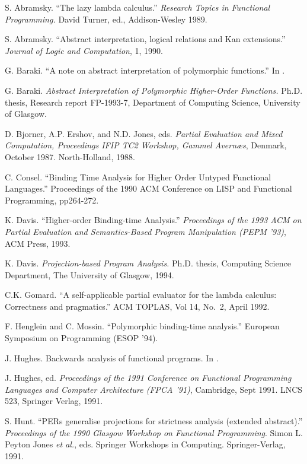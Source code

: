 \documentclass[11pt]{article}
\begin{document}
\begin{thebibliography}{123456}

S. Abramsky. 
``The lazy lambda calculus.'' 
{\it Research Topics in Functional Programming.}
David Turner, ed., Addison-Wesley 1989.

S. Abramsky. 
``Abstract interpretation, logical relations and Kan extensions.''
{\it Journal of Logic and Computation}, 1, 1990.

G. Baraki.
``A note on abstract interpretation of polymorphic functions.''
In \cite{Hug91}.

G. Baraki.
{\it Abstract Interpretation of Polymorphic Higher-Order Functions.}
Ph.D. thesis, Research report FP-1993-7, 
Department of Computing Science, University of Glasgow.

D. Bjorner, A.P. Ershov, and N.D. Jones, eds.
{\it Partial Evaluation and Mixed Computation,
Proceedings IFIP TC2 Workshop, Gammel Avern{\ae}s}, Denmark, October 1987.
North-Holland, 1988.

C. Consel. 
``Binding Time Analysis for Higher Order Untyped Functional Languages.''
Proceedings of the 1990 ACM Conference on LISP and 
Functional Programming, pp264-272.

K. Davis.
``Higher-order Binding-time Analysis.'' 
{\it Proceedings of the 1993 ACM on Partial Evaluation and
Semantics-Based Program Manipulation (PEPM '93)},
ACM Press, 1993.

K. Davis.
{\it Projection-based Program Analysis.}
Ph.D. thesis, Computing Science Department,
The University of Glasgow, 1994.

C.K. Gomard.
``A self-applicable partial evaluator for the lambda calculus:  Correctness
and pragmatics.''
ACM TOPLAS, Vol 14, No.\ 2, April 1992.

F. Henglein and C. Mossin.
``Polymorphic binding-time analysis.''
European Symposium on Programming (ESOP '94).

J. Hughes.
Backwards analysis of functional programs.
In \cite{BEJ88}.

J. Hughes, ed.
{\it Proceedings of the 1991 Conference on Functional Programming Languages
and Computer Architecture (FPCA '91)}, Cambridge, Sept 1991. LNCS 523,
Springer Verlag, 1991.

S. Hunt.
``PERs generalise projections for strictness analysis (extended abstract).''
{\it Proceedings of the 1990 Glasgow Workshop
on Functional Programming}.
Simon L. Peyton Jones {\it et al.}, eds.
Springer Workshops in Computing.
Springer-Verlag, 1991.


\end{thebibliography}
\end{document}

